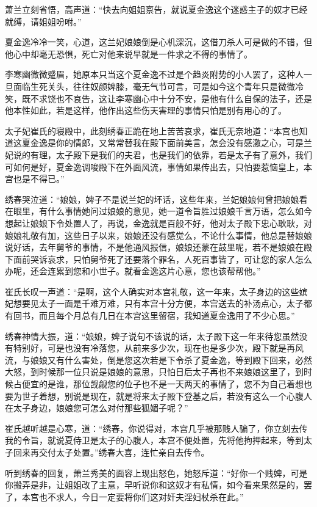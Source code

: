 萧兰立刻省悟，高声道：“快去向姐姐禀告，就说夏金逸这个迷惑主子的奴才已经就缚，请姐姐吩咐。”

夏金逸冷冷一笑，心道，这兰妃娘娘倒是心机深沉，这借刀杀人可是做的不错，但他心中却毫无恐惧，死亡对他来说早就是一件求之不得的事情了。

李寒幽微微蹙眉，她原本只当这个夏金逸不过是个趋炎附势的小人罢了，这种人一旦面临生死关头，往往奴颜婢膝，毫无气节可言，可是如今这个青年只是微微冷笑，既不求饶也不哀告，这让李寒幽心中十分不安，是他有什么自保的法子，还是他本性如此，若是这样，他作出这些伤天害理的事情只怕是别有用心的了。

太子妃崔氏的寝殿中，此刻绣春正跪在地上苦苦哀求，崔氏无奈地道：“本宫也知道这夏金逸是你的情郎，又常常替我在殿下面前美言，怎会没有感激之心，可是兰妃说的有理，太子殿下是我们的夫君，也是我们的依靠，若是太子有了意外，我们可如何是好，夏金逸调唆殿下在外面风流，事情如果传出去，只怕要惹恼皇上，本宫也是不得已。”

绣春哭泣道：“娘娘，婢子不是说兰妃的坏话，这些年来，兰妃娘娘何曾把娘娘看在眼里，有什么事情她问过娘娘的意见，她一道令旨胜过娘娘千言万语，怎么如今想起让娘娘下令处置人了，再说，金逸就是百般不好，他对太子殿下忠心耿耿，对娘娘礼敬有加，这些日子以来，娘娘还没有感觉么，不论什么事情，他总是替娘娘说好话，去年舅爷的事情，不是他通风报信，娘娘还蒙在鼓里呢，若不是娘娘在殿下面前哭诉哀求，只怕舅爷死了还要落个罪名，人死百事皆了，可让您的家人怎么办呢，还会连累到您和小世子。就看金逸这片心意，您也该帮帮他。”

崔氏长叹一声道：“是啊，这个人确实对本宫礼敬，这一年来，太子身边的这些嫔妃想要见太子一面是千难万难，只有本宫十分方便，本宫送去的补汤点心，太子都有回书，而且每个月总有几日在本宫这里留宿，我知道夏金逸用了不少心思。”

绣春神情大振，道：“娘娘，婢子说句不该说的话，太子殿下这一年来待您虽然没有特别好，可是也没有冷落您，从前来多少次，现在也是多少次，殿下就是再风流，与娘娘又有什么害处，倒是您这次若是下令杀了夏金逸，等到殿下回来，必然大怒，到时候那一位只说是娘娘的意思，只怕日后太子再也不来娘娘这里了，到时候占便宜的是谁，那位觊觎您的位子也不是一天两天的事情了，您不为自己着想也要为世子着想，别说是现在，就是将来太子殿下登基之后，若没有这么一个心腹人在太子身边，娘娘您可怎么对付那些狐媚子呢？”

崔氏越听越是心寒，道：“绣春，你说得对，本宫几乎被那贱人骗了，你立刻去传我的令旨，就说夏侍卫是太子的心腹人，本宫不便处置，先将他拘押起来，等到太子回来再交付太子处置。”绣春大喜，连忙亲自去传令。

听到绣春的回复，萧兰秀美的面容上现出怒色，她怒斥道：“好你一个贱婢，可是你搬弄是非，让姐姐改了主意，早听说你和这奴才有私情，如今看来果然是的，罢了，本宫也不求人，今日一定要将你们这对奸夫淫妇杖杀在此。”


